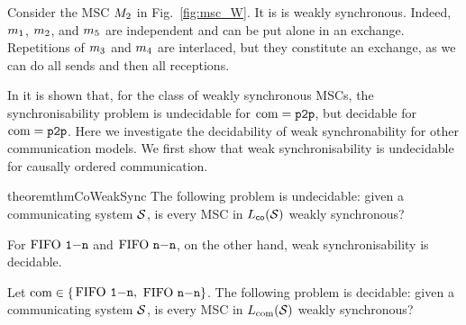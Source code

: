 \begin{example}\label{example:msc_W}
	Consider the MSC $M_{2}$ in Fig.~\ref{fig:msc_W}. It is is weakly synchronous. Indeed, $m_1$, $m_2$, and $m_5$ are independent and can be put alone in an exchange. Repetitions of $m_3$ and $m_4$ are interlaced, but they constitute an exchange, as we can do all sends and then all receptions.
\end{example}

In \cite{BolligGFLLS21} it is shown that, for the class of weakly synchronous MSCs, 
the synchronisability problem is undecidable for $\textup{com} = \mathtt{p2p}$, but decidable for $\textup{com} = \mathtt{p2p}$.
Here we investigate the decidability of weak synchronability for other 
communication models. We first show that weak synchronisability 
is undecidable for causally ordered communication. 

\begin{restatable}{theorem}{thmCoWeakSync}
\label{thm:co-weaksync}
	The following problem is undecidable:
	given a communicating system $\mathcal{S}$,
	is every MSC in $L_{\mathsf{co}}(\mathcal{S})$ weakly synchronous?
\end{restatable}

For $\text{FIFO } \mathtt{1\mathsf{-}n}$ and $\text{FIFO } \mathtt{n\mathsf{-}n}$, on the other hand, weak synchronisability is decidable. 

\begin{proposition}\label{thm:weak-sync}
	Let $\textup{com} \in \{$$\text{FIFO } \mathtt{1\mathsf{-}n}, $ $\text{FIFO } \mathtt{n\mathsf{-}n}\}$.
	The following problem is decidable:
	given a communicating system $\mathcal{S}$,
	is every MSC in $L_{\textup{com}}(\mathcal{S})$ weakly synchronous?
\end{proposition}

